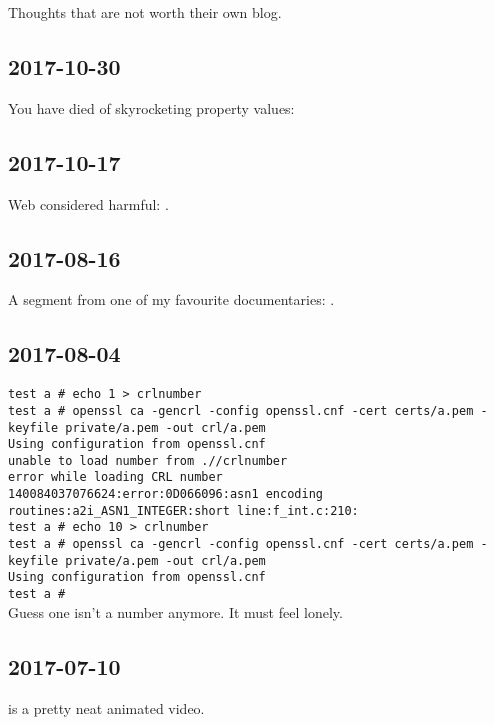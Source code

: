 \documentclass{article}
\begin{document}
Thoughts that are not worth their own blog.

\subsection{2017-10-30}
You have died of skyrocketing property values: 

\subsection{2017-10-17}
Web considered harmful: .

\subsection{2017-08-16}
A segment from one of my favourite documentaries: .

\subsection{2017-08-04}
\texttt{test a # echo 1 > crlnumber \\
test a # openssl ca -gencrl -config openssl.cnf -cert certs/a.pem -keyfile private/a.pem -out crl/a.pem \\
Using configuration from openssl.cnf \\
unable to load number from .//crlnumber \\
error while loading CRL number \\
140084037076624:error:0D066096:asn1 encoding routines:a2i_ASN1_INTEGER:short line:f_int.c:210: \\
test a # echo 10 > crlnumber \\
test a # openssl ca -gencrl -config openssl.cnf -cert certs/a.pem -keyfile private/a.pem -out crl/a.pem \\
Using configuration from openssl.cnf \\
test a #} \\
Guess one isn't a number anymore.  It must feel lonely.

\subsection{2017-07-10}
 is a pretty neat animated video.
\end{document}
